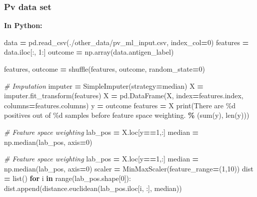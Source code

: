 \documentclass[
  11pt,
  oneside]{book}
\newenvironment{Shaded}{\begin{snugshade}}{\end{snugshade}}
\newcommand{\BuiltInTok}[1]{#1}
\newcommand{\CommentTok}[1]{\textcolor[rgb]{0.56,0.35,0.01}{\textit{#1}}}
\newcommand{\ControlFlowTok}[1]{\textcolor[rgb]{0.13,0.29,0.53}{\textbf{#1}}}
\newcommand{\DecValTok}[1]{\textcolor[rgb]{0.00,0.00,0.81}{#1}}
\newcommand{\KeywordTok}[1]{\textcolor[rgb]{0.13,0.29,0.53}{\textbf{#1}}}
\newcommand{\NormalTok}[1]{#1}
\newcommand{\OperatorTok}[1]{\textcolor[rgb]{0.81,0.36,0.00}{\textbf{#1}}}
\newcommand{\SpecialCharTok}[1]{\textcolor[rgb]{0.00,0.00,0.00}{#1}}
\newcommand{\StringTok}[1]{\textcolor[rgb]{0.31,0.60,0.02}{#1}}
\begin{document}
\hypertarget{pv-data-set-4}{%
\subsubsection{Pv data set}\label{pv-data-set-4}}

\textbf{In Python: }

\begin{Shaded}
\begin{Highlighting}[]
\NormalTok{data }\OperatorTok{=}\NormalTok{ pd.read\_csv(}\StringTok{\textquotesingle{}./other\_data/pv\_ml\_input.csv\textquotesingle{}}\NormalTok{, index\_col}\OperatorTok{=}\DecValTok{0}\NormalTok{)}
\NormalTok{features }\OperatorTok{=}\NormalTok{ data.iloc[:, }\DecValTok{1}\NormalTok{:]}
\NormalTok{outcome }\OperatorTok{=}\NormalTok{ np.array(data.antigen\_label)}

\NormalTok{features, outcome }\OperatorTok{=}\NormalTok{ shuffle(features, outcome, random\_state}\OperatorTok{=}\DecValTok{0}\NormalTok{)}

\CommentTok{\# Imputation}
\NormalTok{imputer }\OperatorTok{=}\NormalTok{ SimpleImputer(strategy}\OperatorTok{=}\StringTok{\textquotesingle{}median\textquotesingle{}}\NormalTok{)}
\NormalTok{X }\OperatorTok{=}\NormalTok{ imputer.fit\_transform(features)}
\NormalTok{X }\OperatorTok{=}\NormalTok{ pd.DataFrame(X, index}\OperatorTok{=}\NormalTok{features.index, columns}\OperatorTok{=}\NormalTok{features.columns)}
\NormalTok{y }\OperatorTok{=}\NormalTok{ outcome}
\NormalTok{features }\OperatorTok{=}\NormalTok{ X}
\BuiltInTok{print}\NormalTok{(}\StringTok{\textquotesingle{}There are }\SpecialCharTok{\%d}\StringTok{ positives out of }\SpecialCharTok{\%d}\StringTok{ samples before feature space weighting.\textquotesingle{}} \OperatorTok{\%}\NormalTok{ (}\BuiltInTok{sum}\NormalTok{(y), }\BuiltInTok{len}\NormalTok{(y)))}

\CommentTok{\# Feature space weighting}
\NormalTok{lab\_pos }\OperatorTok{=}\NormalTok{ X.loc[y}\OperatorTok{==}\DecValTok{1}\NormalTok{,:]}
\NormalTok{median }\OperatorTok{=}\NormalTok{ np.median(lab\_pos, axis}\OperatorTok{=}\DecValTok{0}\NormalTok{)}

\CommentTok{\# Feature space weighting}
\NormalTok{lab\_pos }\OperatorTok{=}\NormalTok{ X.loc[y}\OperatorTok{==}\DecValTok{1}\NormalTok{,:]}
\NormalTok{median }\OperatorTok{=}\NormalTok{ np.median(lab\_pos, axis}\OperatorTok{=}\DecValTok{0}\NormalTok{)}
\NormalTok{scaler }\OperatorTok{=}\NormalTok{ MinMaxScaler(feature\_range}\OperatorTok{=}\NormalTok{(}\DecValTok{1}\NormalTok{,}\DecValTok{10}\NormalTok{))}
\NormalTok{dist }\OperatorTok{=} \BuiltInTok{list}\NormalTok{()}
\ControlFlowTok{for}\NormalTok{ i }\KeywordTok{in} \BuiltInTok{range}\NormalTok{(lab\_pos.shape[}\DecValTok{0}\NormalTok{]):}
\NormalTok{    dist.append(distance.euclidean(lab\_pos.iloc[i, :], median))}
    

\end{Highlighting}
\end{Shaded}
\end{document}
